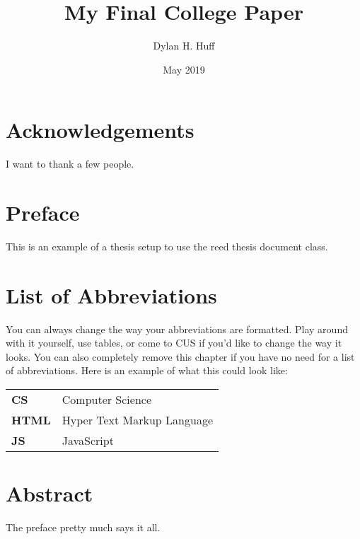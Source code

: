 \documentclass[12pt,twoside]{reedthesis}
\title{My Final College Paper}
\author{Dylan H. Huff}
\date{May 2019}
\begin{document}
  \maketitle
  \frontmatter %
  \pagestyle{empty} %

    \chapter*{Acknowledgements}
	I want to thank a few people.

    \chapter*{Preface}
	This is an example of a thesis setup to use the reed thesis document class.
	
	

    \chapter*{List of Abbreviations}
		You can always change the way your abbreviations are formatted. Play around with it yourself, use tables, or come to CUS if you'd like to change the way it looks. You can also completely remove this chapter if you have no need for a list of abbreviations. Here is an example of what this could look like:

	\begin{table}[h]
	\centering %
	\begin{tabular}{ll}
		\textbf{CS}   & Computer Science\\
		\textbf{HTML} & Hyper Text Markup Language\\
		\textbf{JS}  	&  JavaScript\\
	\end{tabular}
	\end{table}
	

    \tableofcontents
    \listoftables
    \listoffigures

    \chapter*{Abstract}
	The preface pretty much says it all.
	
\end{document}
